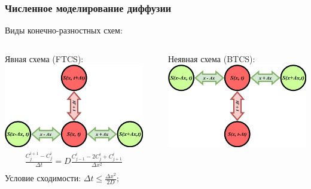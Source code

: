 \documentclass[10pt,pdf,hyperref={unicode},aspectratio={169}]{beamer}
\begin{document}
\begin{frame}
	\frametitle{Численное моделирование диффузии}
		{\color{blue} Виды конечно-разностных схем:}

	\begin{columns}
		{\small\color{red} Явная схема (FTCS):}\\
		\includegraphics[width=.99\textwidth,center]{assets/FTCS}\\
		\scriptsize
		\begin{gather*}
			\frac{C^{i+1}_{j} - C^{i}_{j}}{\Delta t} = D \frac{C^{i}_{j-1} -2C^{i}_{j} + C^{i}_{j+1}}{\Delta x^{2}}\\
		\end{gather*}
		{\small\color{red} Условие сходимости:}
		$
			\Delta t \leq \frac{\Delta x^{2}}{2D};
		$
		\rule[0mm]{0.2ex}{60mm}
		{\small\color{red} Неявная схема (BTCS):}\\
		\includegraphics[width=.99\textwidth,center]{assets/BTCS}\\

\end{columns}
\end{frame}
\end{document}
